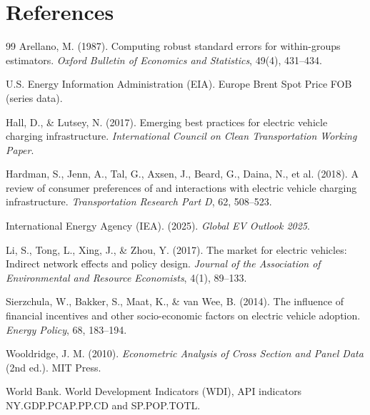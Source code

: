 \documentclass[a4paper,12pt]{article}
\begin{document}
\clearpage
\section*{References}
\begin{thebibliography}{99}
Arellano, M. (1987). Computing robust standard errors for within-groups estimators. \textit{Oxford Bulletin of Economics and Statistics}, 49(4), 431--434.

U.S. Energy Information Administration (EIA). Europe Brent Spot Price FOB (series data).

Hall, D., \& Lutsey, N. (2017). Emerging best practices for electric vehicle charging infrastructure. \textit{International Council on Clean Transportation Working Paper}.

Hardman, S., Jenn, A., Tal, G., Axsen, J., Beard, G., Daina, N., et al. (2018). A review of consumer preferences of and interactions with electric vehicle charging infrastructure. \textit{Transportation Research Part D}, 62, 508--523.

International Energy Agency (IEA). (2025). \textit{Global EV Outlook 2025}.

Li, S., Tong, L., Xing, J., \& Zhou, Y. (2017). The market for electric vehicles: Indirect network effects and policy design. \textit{Journal of the Association of Environmental and Resource Economists}, 4(1), 89--133.

Sierzchula, W., Bakker, S., Maat, K., \& van Wee, B. (2014). The influence of financial incentives and other socio-economic factors on electric vehicle adoption. \textit{Energy Policy}, 68, 183--194.

Wooldridge, J. M. (2010). \textit{Econometric Analysis of Cross Section and Panel Data} (2nd ed.). MIT Press.

World Bank. World Development Indicators (WDI), API indicators NY.GDP.PCAP.PP.CD and SP.POP.TOTL.
\end{thebibliography}
\end{document}
